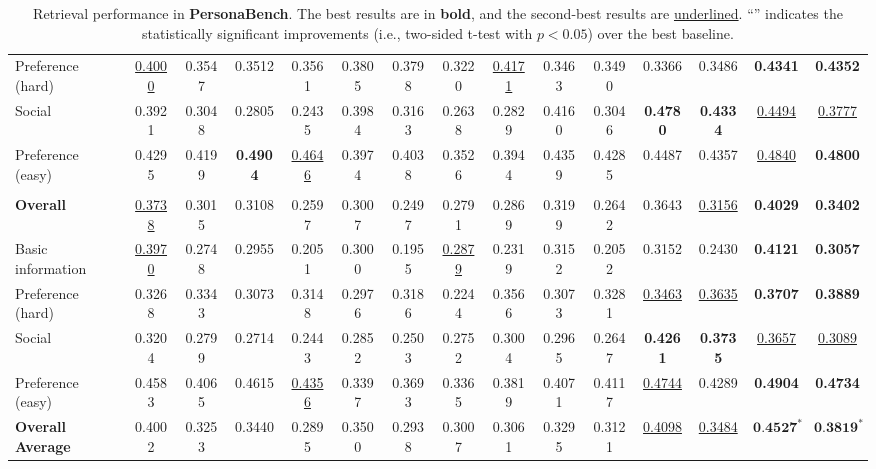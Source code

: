 \begin{table}[t]
\begin{tabular}{lcccccccccccccc}
Preference (hard) & \underline{0.4000} & 0.3547 & 0.3512 & 0.3561 & 0.3805 & 0.3798 & 0.3220 & \underline{0.4171} & 0.3463 & 0.3490 &0.3366&0.3486& \textbf{0.4341} & \textbf{0.4352} \\
Social & 0.3921 & 0.3048 & 0.2805 & 0.2435 & 0.3984 & 0.3163 & 0.2638 & 0.2829 & 0.4160 & 0.3046 &\textbf{0.4780}&\textbf{0.4334}& \underline{0.4494} & \underline{0.3777} \\
Preference (easy) & 0.4295 & 0.4199 & \textbf{0.4904} & \underline{0.4646} & 0.3974 & 0.4038 & 0.3526 & 0.3944 & 0.4359 & 0.4285 &0.4487&0.4357& \underline{0.4840} & \textbf{0.4800} \\
\midrule
\rowcolor{gray!15}
\multicolumn{15}{c}{\textit{bge-base-en-v1.5}} \\
\textbf{Overall} & \underline{0.3738} & 0.3015 & 0.3108 & 0.2597 & 0.3007 & 0.2497 & 0.2791 & 0.2869 & 0.3199 & 0.2642 &0.3643&\underline{0.3156}& \textbf{0.4029} & \textbf{0.3402} \\
Basic information & \underline{0.3970} & 0.2748 & 0.2955 & 0.2051 & 0.3000 & 0.1955 & \underline{0.2879} & 0.2319 & 0.3152 & 0.2052 &0.3152&0.2430& \textbf{0.4121} & \textbf{0.3057} \\
Preference (hard) & 0.3268 & 0.3343 & 0.3073 & 0.3148 & 0.2976 & 0.3186 & 0.2244 & 0.3566 & 0.3073 & 0.3281 &\underline{0.3463}&\underline{0.3635}& \textbf{0.3707} & \textbf{0.3889} \\
Social & 0.3204 & 0.2799 & 0.2714 & 0.2443 & 0.2852 & 0.2503 & 0.2752 & 0.3004 & 0.2965 & 0.2647 &\textbf{0.4261}&\textbf{0.3735}& \underline{0.3657} & \underline{0.3089} \\
Preference (easy) & 0.4583 & 0.4065 & 0.4615 & \underline{0.4356} & 0.3397 & 0.3693 & 0.3365 & 0.3819 & 0.4071 & 0.4117 &\underline{0.4744}&0.4289& \textbf{0.4904} & \textbf{0.4734} \\
\midrule
\textbf{Overall Average} & 0.4002 & 0.3253 & 0.3440 & 0.2895 & 0.3500 & 0.2938 & 0.3007 & 0.3061 & 0.3295 & 0.3121 &\underline{0.4098}& \underline{0.3484}& $\textbf{0.4527}^*$ & $\textbf{0.3819}^*$\\
\bottomrule
\end{tabular}
\caption{Retrieval performance in \textbf{PersonaBench}. The best results are in \textbf{bold}, and the second-best results are \underline{underlined}. ``\textbf{{\Large *}}'' indicates the statistically significant improvements (i.e., two-sided t-test with $p<0.05$) over the best baseline. }
\label{tab:main_results}
\vspace{-10pt}
\end{table}

